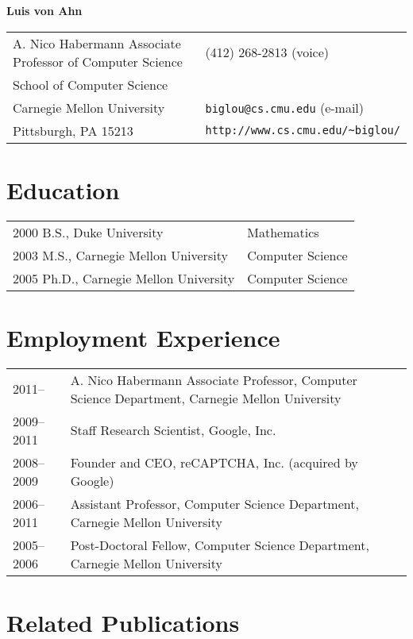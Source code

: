 \documentclass{article}
\begin{document}
\begin{center}
{\large\bf Luis von Ahn}
\end{center}

\begin{flushleft}
\begin{tabular}{p{3.75in}l}
A. Nico Habermann Associate Professor of Computer Science      & (412) 268-2813 (voice)\\
School of Computer Science & \\
Carnegie Mellon University            & {\tt biglou@cs.cmu.edu} (e-mail)\\
Pittsburgh, PA 15213     & \verb+http://www.cs.cmu.edu/~biglou/+\\
\end{tabular}
\end{flushleft}

\section*{Education}

\begin{tabular}{ll}
2000 B.S., Duke University & Mathematics\\
2003 M.S., Carnegie Mellon University & Computer Science\\
2005 Ph.D., Carnegie Mellon University & Computer Science\\
\end{tabular}

\section*{Employment Experience}

\begin{tabular}{ll}
2011-- & A. Nico Habermann Associate Professor, Computer Science Department, Carnegie Mellon University\\
2009--2011 & Staff Research Scientist, Google, Inc.\\
2008--2009 & Founder and CEO, reCAPTCHA, Inc. (acquired by Google)\\
2006--2011 & Assistant Professor, Computer Science Department, Carnegie Mellon University\\
2005--2006 & Post-Doctoral Fellow, Computer Science Department, Carnegie Mellon University\\
\end{tabular}

\section*{Related Publications}
\end{document}
